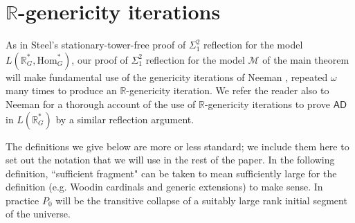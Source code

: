 \documentclass[fleqn, 11pt]{amsart}
\theoremstyle{plain}
\theoremstyle{definition}
\theoremstyle{remark}
\newcommand{\Hom}{\mathrm{Hom}}
\begin{document}
\section{$\mathbb{R}$-genericity iterations}\label{sec-R-genericity-iterations}



As in Steel's stationary-tower-free proof \cite{SteSTFree} of $\Sigma^2_1$ reflection for the model $L(\mathbb{R}^*_G, \Hom^*_G)$, our proof of $\Sigma^2_1$ reflection for the model $\mathcal{M}$ of the main theorem will make fundamental use 
of the genericity iterations of Neeman \cite{NeeOptimalII}, repeated $\omega$ many times to produce an $\mathbb{R}$-genericity iteration.
We refer the reader also to Neeman \cite{NeeHandbook} for a thorough account of the use of $\mathbb{R}$-genericity iterations to prove $\mathsf{AD}$ in $L(\mathbb{R}^*_G)$ by a similar reflection argument.

The definitions we give below are more or less standard; we include them here to set out the notation that we will use in the rest of the paper. 
In the following definition, ``sufficient fragment" can be taken to mean sufficiently large for the definition (e.g. Woodin cardinals and generic extensions) to make sense. In practice $P_{0}$ will be the transitive collapse of a suitably large rank initial segment of the universe. 
\end{document}
